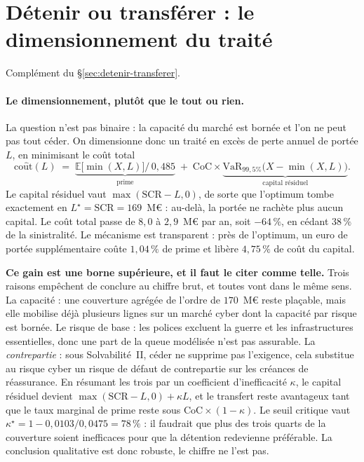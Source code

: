 \section{Détenir ou transférer : le dimensionnement du traité}
\label{sec:ann-detenir}


Complément du \S\ref{sec:detenir-transferer}.

\paragraph{Le dimensionnement, plutôt que le tout ou rien.} La question n'est pas binaire : la
capacité du marché est bornée et l'on ne peut pas tout céder. On dimensionne donc un traité en
excès de perte annuel de portée $L$, en minimisant le coût total
\[
  \mathrm{co\hat ut}(L) \;=\; \underbrace{\mathbb E\bigl[\min(X,L)\bigr]\big/\,0{,}485}_{\text{prime}}
  \;+\; \mathrm{CoC}\times \underbrace{\mathrm{VaR}_{99{,}5\%}\bigl(X-\min(X,L)\bigr)}_{\text{capital résiduel}} .
\]
Le capital résiduel vaut $\max(\mathrm{SCR}-L,0)$, de sorte que l'optimum tombe exactement en
$L^\star=\mathrm{SCR}=169$~M\euro{} : au-delà, la portée ne rachète plus aucun capital. Le
coût total passe de $8{,}0$ à $2{,}9$~M\euro{} par an, soit $-64\,\%$, en
cédant $38\,\%$ de la sinistralité. Le mécanisme est transparent : près de l'optimum, un euro
de portée supplémentaire coûte $1{,}04\,\%$ de prime et libère $4{,}75\,\%$ de coût du capital.

\begin{attention}
\textbf{Ce gain est une borne supérieure, et il faut le citer comme telle.} Trois raisons
empêchent de conclure au chiffre brut, et toutes vont dans le même sens. La capacité :
une couverture agrégée de l'ordre de $170$~M\euro{} reste plaçable, mais elle mobilise déjà
plusieurs lignes sur un marché cyber dont la capacité par risque est bornée. Le risque
de base : les polices excluent la guerre et les
infrastructures essentielles, donc une part de la queue modélisée n'est pas assurable. La
\emph{contrepartie} : sous Solvabilité~II, céder ne supprime pas l'exigence, cela substitue
au risque cyber un risque de défaut de contrepartie sur les créances de réassurance. En
résumant les trois par un coefficient d'inefficacité $\kappa$, le capital résiduel devient
$\max(\mathrm{SCR}-L,0)+\kappa L$, et le transfert reste avantageux tant que le taux marginal
de prime reste sous $\mathrm{CoC}\times(1-\kappa)$. Le seuil critique vaut
$\kappa^\star=1-0{,}0103/0{,}0475=78\,\%$ : il faudrait que plus des trois quarts de
la couverture soient inefficaces pour que la détention redevienne préférable. La conclusion
qualitative est donc robuste, le chiffre ne l'est pas.
\end{attention}

